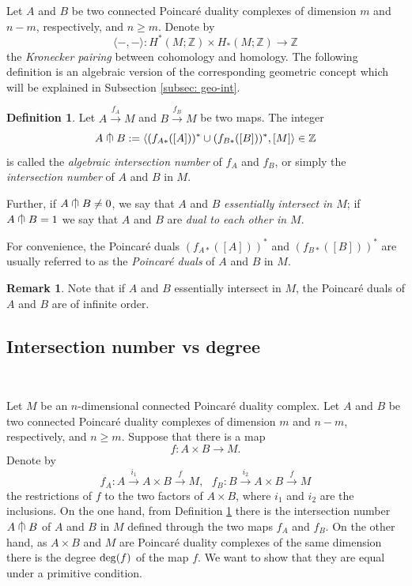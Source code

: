 \documentclass[a4]{amsart}
\theoremstyle{definition}
\newtheorem{definition}[theorem]{Definition}
\newtheorem{remark}[theorem]{Remark}
\newcommand{\testcap}{\mathrel{\vcenter{\offinterlineskip
\hbox{$\cap$}\vskip-1.8ex\hbox{$\kern0.2em | \kern0.15em$}}}}
\begin{document}
\begin{sloppypar}
Let $A$ and $B$ be two connected Poincar\'{e} duality complexes of dimension $m$ and $n-m$, respectively, and $n\geq m$. Denote by 
\[
\langle- ,- \rangle: H^\ast(M;\mathbb{Z})\times H_\ast(M;\mathbb{Z})\longrightarrow \mathbb{Z}
\]
the {\it Kronecker pairing} between cohomology and homology. The following definition is an algebraic version of the corresponding geometric concept which will be explained in Subsection \ref{subsec: geo-int}. 
\begin{definition}\label{alg-intdef}
Let $A\stackrel{f_A}{\longrightarrow} M$ and $B\stackrel{f_B}{\longrightarrow} M$ be two maps. 
The integer
\begin{equation}\label{int=1eq}
A \testcap B:= \langle (f_{A\ast}([A]))^\ast\cup (f_{B\ast}([B]))^\ast, [M]\rangle \in \mathbb{Z}
\end{equation}
is called the {\it algebraic intersection number} of $f_A$ and $f_B$, or simply the {\it intersection number} of $A$ and $B$ in $M$. 

Further, 
if $A \testcap B\neq 0$, we say that $A$ and $B$ {\it essentially intersect in $M$}; 
if $A \testcap B=1$ we say that $A$ and $B$ are {\it dual to each other in $M$}.
\end{definition}

For convenience, the Poincar\'{e} duals $(f_{A\ast}([A]))^\ast$ and $(f_{B\ast}([B]))^\ast$ are usually referred to as the {\it Poincar\'{e} duals} of $A$ and $B$ in $M$. 
\begin{remark}\label{ordxrmk}
Note that if $A$ and $B$ essentially intersect in $M$, the Poincar\'{e} duals of $A$ and $B$ are of infinite order. 
\end{remark}

\subsection{Intersection number vs degree}
\label{subsec: int-deg} 

$\, $

Let $M$ be an $n$-dimensional connected Poincar\'{e} duality complex. Let $A$ and $B$ be two connected Poincar\'{e} duality complexes of dimension $m$ and $n-m$, respectively, and $n\geq m$. 
Suppose that there is a map 
\begin{equation}\label{fABMeq}
f: A\times B\stackrel{}{\longrightarrow} M.
\end{equation}
Denote by 
\[
f_A: A\stackrel{i_1}{\longrightarrow} A\times B\stackrel{f}{\longrightarrow} M ,\ \ \ 
f_B: B\stackrel{i_2}{\longrightarrow} A\times B\stackrel{f}{\longrightarrow} M 
\]
the restrictions of $f$ to the two factors of $A\times B$, where $i_1$ and $i_2$ are the inclusions. On the one hand, from Definition \ref{alg-intdef} there is the intersection number  $A\testcap B$ of $A$ and $B$ in $M$ defined through the two maps $f_A$ and $f_B$. On the other hand, as $A\times B$ and $M$ are Poincar\'{e} duality complexes of the same dimension there is the degree ${\rm deg}(f)$ of the map $f$. We want to show that they are equal under a primitive condition.  


\end{sloppypar}
\end{document}
